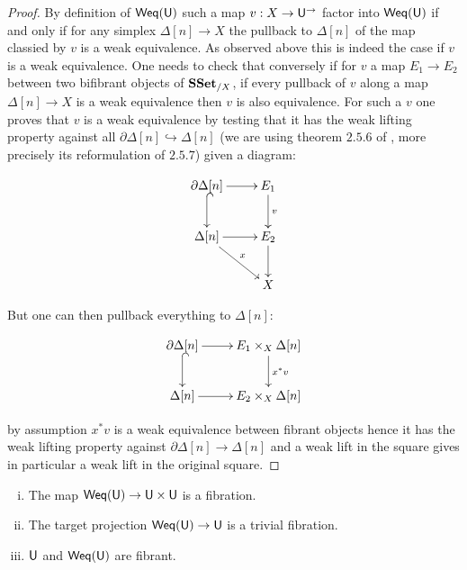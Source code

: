 \documentclass[reqno,10pt,a4paper,oneside,draft]{amsart}
\begin{document}
\begin{proof}
By definition of $\mathsf{Weq}(\mathsf{U})$ such a map $v:X \rightarrow \mathsf{U}^{\rightarrow}$ factor into $\mathsf{Weq}(\mathsf{U})$ if and only if for any simplex $\Delta[n] \rightarrow X$ the pullback to $\Delta[n]$ of the map classied by $v$ is a weak equivalence. As observed above this is indeed the case if $v$ is a weak equivalence. One needs to check that conversely if for $v$ a map $E_1 \rightarrow E_2$ between two bifibrant objects of $\mathbf{SSet}_{/X}$, if every pullback of $v$ along a map $\Delta[n] \rightarrow X$ is a weak equivalence then $v$ is also equivalence.  For such a $v$ one proves that $v$ is a weak equivalence by testing that it has the weak lifting property against all $\partial \Delta[n] \hookrightarrow \Delta[n]$ (we are using theorem $2.5.6$ of \cite{henry2018wms}, more precisely its reformulation of $2.5.7$) given a diagram:


\[ \xymatrix{\partial \Delta[n] \ar[r] \ar@{^{(}->}[d] & E_1 \ar[d]^v \\
\Delta[n] \ar[r] \ar[dr]^{x}
 & E_2 \ar[d] \\
& X
} \]

But one can then pullback everything to $\Delta[n]$:

\[ \xymatrix{\partial \Delta[n] \ar[r] \ar@{^{(}->}[d] & E_1 \times_X \Delta[n] \ar[d]^{x^*v} \\
\Delta[n] \ar[r] & E_2 \times_X \Delta[n]  \\
} \]

by assumption $x^* v$ is a weak equivalence between fibrant objects hence it has the weak lifting property against $\partial \Delta[n] \rightarrow \Delta[n]$ and a weak lift in the square gives in particular a weak lift in the original square.
\end{proof}



\begin{proposition}
\leavevmode
\begin{enumerate}[(i)]

\item The map $\mathsf{Weq}(\mathsf{U}) \rightarrow \mathsf{U} \times \mathsf{U}$ is a fibration.

\item The target projection $\mathsf{Weq}(\mathsf{U}) \rightarrow \mathsf{U}$ is a trivial fibration.

\item $\mathsf{U}$ and $\mathsf{Weq}(\mathsf{U})$ are fibrant.

\end{enumerate}

\end{proposition}
\end{document}
